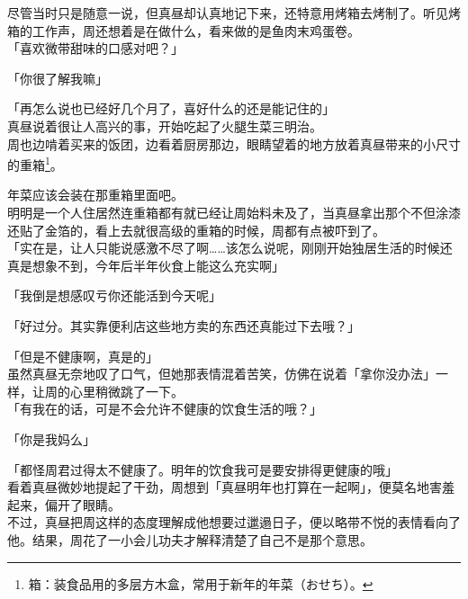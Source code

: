 尽管当时只是随意一说，但真昼却认真地记下来，还特意用烤箱去烤制了。听见烤箱的工作声，周还想着是在做什么，看来做的是鱼肉末鸡蛋卷。\\

「喜欢微带甜味的口感对吧？」

「你很了解我嘛」

「再怎么说也已经好几个月了，喜好什么的还是能记住的」\\

真昼说着很让人高兴的事，开始吃起了火腿生菜三明治。\\

周也边啃着买来的饭团，边看着厨房那边，眼睛望着的地方放着真昼带来的小尺寸的重箱\footnote{箱：装食品用的多层方木盒，常用于新年的年菜（{\jpfont おせち}）。}。

年菜应该会装在那重箱里面吧。\\

明明是一个人住居然连重箱都有就已经让周始料未及了，当真昼拿出那个不但涂漆还贴了金箔的，看上去就很高级的重箱的时候，周都有点被吓到了。\\

「实在是，让人只能说感激不尽了啊……该怎么说呢，刚刚开始独居生活的时候还真是想象不到，今年后半年伙食上能这么充实啊」

「我倒是想感叹亏你还能活到今天呢」

「好过分。其实靠便利店这些地方卖的东西还真能过下去哦？」

「但是不健康啊，真是的」\\

虽然真昼无奈地叹了口气，但她那表情混着苦笑，仿佛在说着「拿你没办法」一样，让周的心里稍微跳了一下。\\

「有我在的话，可是不会允许不健康的饮食生活的哦？」

「你是我妈么」

「都怪周君过得太不健康了。明年的饮食我可是要安排得更健康的哦」\\

看着真昼微妙地提起了干劲，周想到「真昼明年也打算在一起啊」，便莫名地害羞起来，偏开了眼睛。\\

不过，真昼把周这样的态度理解成他想要过邋遢日子，便以略带不悦的表情看向了他。结果，周花了一小会儿功夫才解释清楚了自己不是那个意思。
